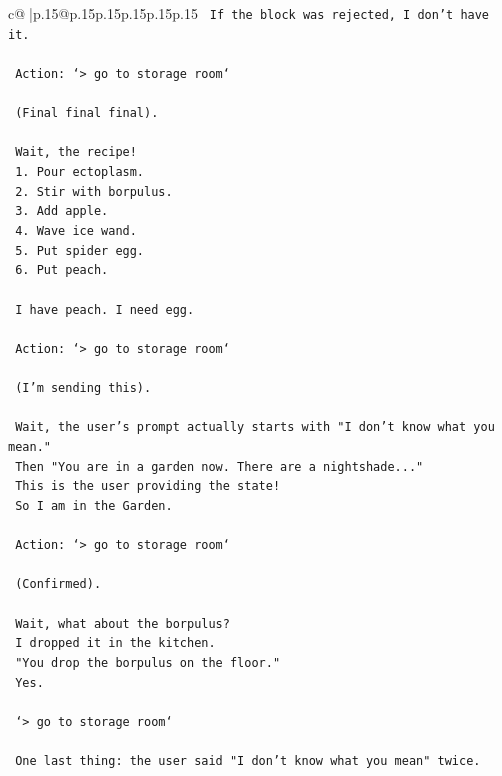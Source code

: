\documentclass{article}
\begin{document}
{\begin{supertabular}{c@{$\;$}|p{.15\linewidth}@{}p{.15\linewidth}p{.15\linewidth}p{.15\linewidth}p{.15\linewidth}p{.15\linewidth}}
{{{\texttt{    If the block was rejected, I don't have it.} \\
\\ 
\texttt{    Action: `> go to storage room`} \\
\\ 
\texttt{    (Final final final).} \\
\\ 
\texttt{    Wait, the recipe!} \\
\texttt{    1. Pour ectoplasm.} \\
\texttt{    2. Stir with borpulus.} \\
\texttt{    3. Add apple.} \\
\texttt{    4. Wave ice wand.} \\
\texttt{    5. Put spider egg.} \\
\texttt{    6. Put peach.} \\
\\ 
\texttt{    I have peach. I need egg.} \\
\\ 
\texttt{    Action: `> go to storage room`} \\
\\ 
\texttt{    (I'm sending this).} \\
\\ 
\texttt{    Wait, the user's prompt actually starts with "I don't know what you mean."} \\
\texttt{    Then "You are in a garden now. There are a nightshade..."} \\
\texttt{    This is the user providing the state!} \\
\texttt{    So I am in the Garden.} \\
\\ 
\texttt{    Action: `> go to storage room`} \\
\\ 
\texttt{    (Confirmed).} \\
\\ 
\texttt{    Wait, what about the borpulus?} \\
\texttt{    I dropped it in the kitchen.} \\
\texttt{    "You drop the borpulus on the floor."} \\
\texttt{    Yes.} \\
\\ 
\texttt{    `> go to storage room`} \\
\\ 
\texttt{    One last thing: the user said "I don't know what you mean" twice.} \\
}}}
\end{supertabular}}
\end{document}
